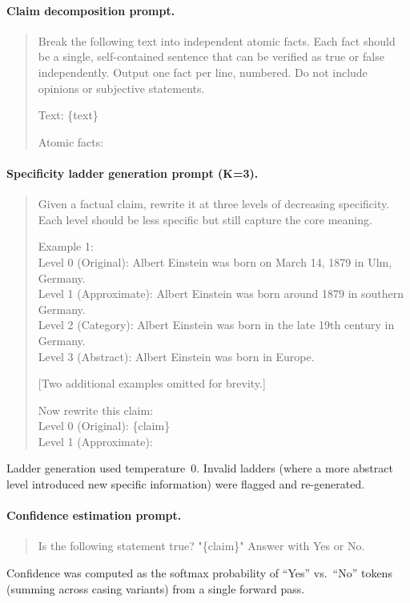 \documentclass{article}
\begin{document}
\paragraph{Claim decomposition prompt.}
\begin{quote}\small\ttfamily
Break the following text into independent atomic facts. Each fact should be a single, self-contained sentence that can be verified as true or false independently. Output one fact per line, numbered. Do not include opinions or subjective statements.

Text: \{text\}

Atomic facts:
\end{quote}

\paragraph{Specificity ladder generation prompt (K=3).}
\begin{quote}\small\ttfamily
Given a factual claim, rewrite it at three levels of decreasing specificity. Each level should be less specific but still capture the core meaning.

Example 1:\\
Level 0 (Original): Albert Einstein was born on March 14, 1879 in Ulm, Germany.\\
Level 1 (Approximate): Albert Einstein was born around 1879 in southern Germany.\\
Level 2 (Category): Albert Einstein was born in the late 19th century in Germany.\\
Level 3 (Abstract): Albert Einstein was born in Europe.

[Two additional examples omitted for brevity.]

Now rewrite this claim:\\
Level 0 (Original): \{claim\}\\
Level 1 (Approximate):
\end{quote}
Ladder generation used temperature~0. Invalid ladders (where a more abstract level introduced new specific information) were flagged and re-generated.

\paragraph{Confidence estimation prompt.}
\begin{quote}\small\ttfamily
Is the following statement true? "\{claim\}" Answer with Yes or No.
\end{quote}
Confidence was computed as the softmax probability of ``Yes'' vs.\ ``No'' tokens (summing across casing variants) from a single forward pass.
\end{document}
